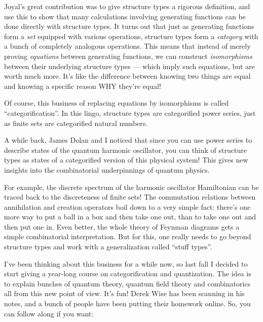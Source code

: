 \documentclass{article}
\def\tightlist{}
\renewcommand{\texttt}[1]{%
  \begingroup
  \ttfamily
  \begingroup\lccode`~=`/\lowercase{\endgroup\def~}{/\discretionary{}{}{}}%
  \begingroup\lccode`~=`[\lowercase{\endgroup\def~}{[\discretionary{}{}{}}%
  \begingroup\lccode`~=`.\lowercase{\endgroup\def~}{.\discretionary{}{}{}}%
  \catcode`/=\active\catcode`[=\active\catcode`.=\active
  \scantokens{#1\noexpand}%
  \endgroup
}
\begin{document}
Joyal's great contribution was to give structure types a rigorous
definition, and use this to show that many calculations involving
generating functions can be done directly with structure types. It turns
out that just as generating functions form a \emph{set} equipped with
various operations, structure types form a \emph{category} with a bunch
of completely analogous operations. This means that instead of merely
proving \emph{equations} between generating functions, we can construct
\emph{isomorphisms} between their underlying structure types --- which
imply such equations, but are worth much more. It's like the difference
between knowing two things are equal and knowing a specific reason WHY
they're equal!

Of course, this business of replacing equations by isomorphisms is
called ``categorification''. In this lingo, structure types are
categorified power series, just as finite sets are categorified natural
numbers.

A while back, James Dolan and I noticed that since you can use power
series to describe states of the quantum harmonic oscillator, you can
think of structure types as states of a categorified version of this
physical system! This gives new insights into the combinatorial
underpinnings of quantum physics.

For example, the discrete spectrum of the harmonic oscillator
Hamiltonian can be traced back to the discreteness of finite sets! The
commutation relations between annihilation and creation operators boil
down to a very simple fact: there's one more way to put a ball in a box
and then take one out, than to take one out and then put one in. Even
better, the whole theory of Feynman diagrams gets a simple combinatorial
interpretation. But for this, one really needs to go beyond structure
types and work with a generalization called ``stuff types''.

I've been thinking about this business for a while now, so last fall I
decided to start giving a year-long course on categorification and
quantization. The idea is to explain bunches of quantum theory, quantum
field theory and combinatorics all from this new point of view. It's
fun! Derek Wise has been scanning in his notes, and a bunch of people
have been putting their homework online. So, you can follow along if you
want:

\end{document}

